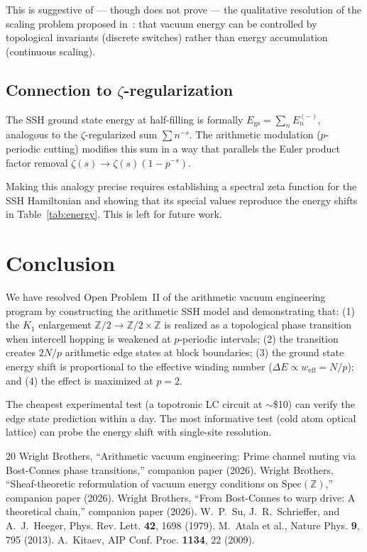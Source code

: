 \documentclass[11pt,a4paper]{article}
\newcommand{\Spec}{\mathrm{Spec}}
\begin{document}
This is suggestive of --- though does not prove --- the
qualitative resolution of the scaling problem proposed
in~\cite{paper_B}: that vacuum energy can be controlled by
topological invariants (discrete switches) rather than
energy accumulation (continuous scaling).

\subsection{Connection to $\zeta$-regularization}

The SSH ground state energy at half-filling is formally
$E_{\mathrm{gs}} = \sum_{n} E_n^{(-)}$, analogous to the
$\zeta$-regularized sum $\sum n^{-s}$. The arithmetic modulation
($p$-periodic cutting) modifies this sum in a way that
parallels the Euler product factor removal
$\zeta(s) \to \zeta(s)(1 - p^{-s})$.

Making this analogy precise requires establishing a
spectral zeta function for the SSH Hamiltonian and showing
that its special values reproduce the energy shifts in
Table~\ref{tab:energy}. This is left for future work.

\section{Conclusion}

We have resolved Open Problem~II of the arithmetic vacuum
engineering program by constructing the arithmetic SSH model
and demonstrating that:
(1) the $K_1$ enlargement $\mathbb{Z}/2 \to \mathbb{Z}/2 \times \mathbb{Z}$
is realized as a topological phase transition when
intercell hopping is weakened at $p$-periodic intervals;
(2) the transition creates $2N/p$ arithmetic edge states at
block boundaries;
(3) the ground state energy shift is proportional to the
effective winding number ($\Delta E \propto w_{\mathrm{eff}} = N/p$);
and (4) the effect is maximized at $p = 2$.

The cheapest experimental test (a topotronic LC circuit at
$\sim$\$10) can verify the edge state prediction within a day.
The most informative test (cold atom optical lattice) can
probe the energy shift with single-site resolution.

\begin{thebibliography}{20}
 Wright Brothers, ``Arithmetic vacuum engineering: Prime channel muting via Bost-Connes phase transitions,'' companion paper (2026).
 Wright Brothers, ``Sheaf-theoretic reformulation of vacuum energy conditions on $\Spec(\mathbb{Z})$,'' companion paper (2026).
 Wright Brothers, ``From Bost-Connes to warp drive: A theoretical chain,'' companion paper (2026).
 W.~P.~Su, J.~R.~Schrieffer, and A.~J.~Heeger, Phys. Rev. Lett. \textbf{42}, 1698 (1979).
 M.~Atala et al., Nature Phys. \textbf{9}, 795 (2013).
 A.~Kitaev, AIP Conf. Proc. \textbf{1134}, 22 (2009).
\end{thebibliography}
\end{document}
